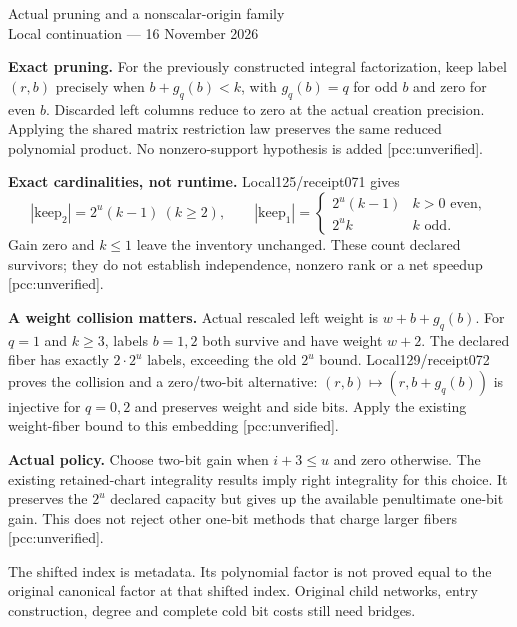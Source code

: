 \documentclass[10pt]{article}
\begin{document}
\begin{center}{\Large Actual pruning and a nonscalar-origin family}\\[4pt]
Local continuation --- 16 November 2026\end{center}
\textbf{Exact pruning.} For the previously constructed integral factorization,
keep label $(r,b)$ precisely when $b+g_q(b)<k$, with $g_q(b)=q$ for odd $b$
and zero for even $b$. Discarded left columns reduce to zero at the actual
creation precision. Applying the shared matrix restriction law preserves
the same reduced polynomial product. No nonzero-support hypothesis is added
[pcc:unverified].

\textbf{Exact cardinalities, not runtime.} Local125/receipt071 gives
\[
|\mathrm{keep}_2|=2^u(k-1)\ (k\ge2),\qquad
|\mathrm{keep}_1|=\begin{cases}2^u(k-1)&k>0\text{ even},\\2^u k&k\text{ odd}.
\end{cases}
\]
Gain zero and $k\le1$ leave the inventory unchanged. These count declared
survivors; they do not establish independence, nonzero rank or a net speedup
[pcc:unverified].

\textbf{A weight collision matters.} Actual rescaled left weight is
$w+b+g_q(b)$. For $q=1$ and $k\ge3$, labels $b=1,2$ both survive and have
weight $w+2$. The declared fiber has exactly $2\cdot2^u$ labels, exceeding
the old $2^u$ bound. Local129/receipt072 proves the collision and a zero/two-bit
alternative: $(r,b)\mapsto(r,b+g_q(b))$ is injective for $q=0,2$ and preserves
weight and side bits. Apply the existing weight-fiber bound to this embedding
[pcc:unverified].

\textbf{Actual policy.} Choose two-bit gain when $i+3\le u$ and zero otherwise.
The existing retained-chart integrality results imply right integrality for
this choice. It preserves the $2^u$ declared capacity but gives up the
available penultimate one-bit gain. This does not reject other one-bit
methods that charge larger fibers [pcc:unverified].

The shifted index is metadata. Its polynomial factor is not proved equal to
the original canonical factor at that shifted index. Original child networks,
entry construction, degree and complete cold bit costs still need bridges.
\end{document}
